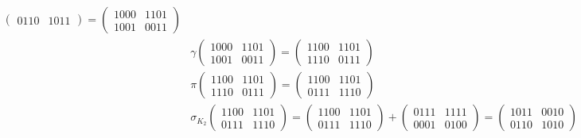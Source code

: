 \documentclass[fleqn]{article}
\begin{document}
\begin{equation*}
\begin{aligned}
\begin{pmatrix}
                0110 & 1011
            \end{pmatrix} =
            \begin{pmatrix}
                1000 & 1101 \\
                1001 & 0011
            \end{pmatrix} \\
            &\gamma \begin{pmatrix}
                1000 & 1101 \\
                1001 & 0011
            \end{pmatrix} =
            \begin{pmatrix}
                1100 & 1101 \\
                1110 & 0111
            \end{pmatrix} \\
            &\pi \begin{pmatrix}
                1100 & 1101 \\
                1110 & 0111
            \end{pmatrix} =
            \begin{pmatrix}
                1100 & 1101 \\
                0111 & 1110
            \end{pmatrix} \\
            &\sigma_{K_2} \begin{pmatrix}
                1100 & 1101 \\
                0111 & 1110
            \end{pmatrix} =
            \begin{pmatrix}
                1100 & 1101 \\
                0111 & 1110
            \end{pmatrix} +
            \begin{pmatrix}
                0111 & 1111 \\
                0001 & 0100
            \end{pmatrix} =
            \begin{pmatrix}
                1011 & 0010 \\
                0110 & 1010
            \end{pmatrix} \\
        \end{aligned}
    \end{equation*}
\end{document}

